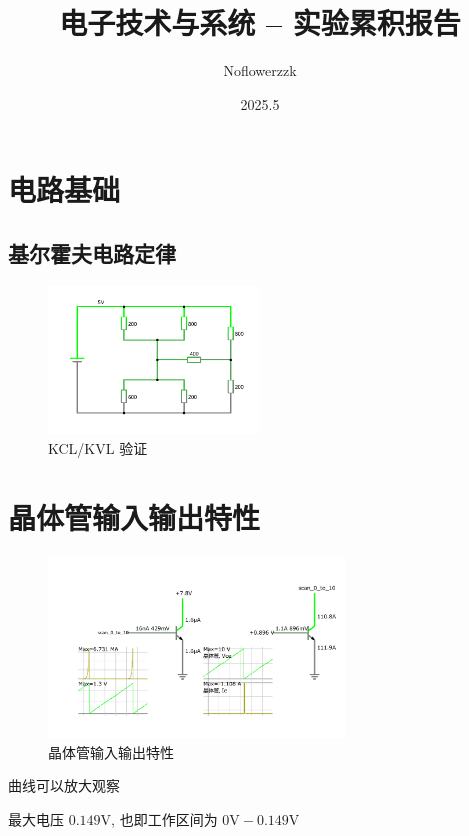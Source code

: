 \documentclass{article}
\title{电子技术与系统 -- 实验累积报告}
\author{Noflowerzzk}
\date{2025.5}
\begin{document}
\maketitle

\section{电路基础}

\subsection{基尔霍夫电路定律}

\begin{figure}[htbp]
    \centering
    \includegraphics[width=0.5\textwidth]{KICL.pdf}
    \caption{KCL/KVL 验证}
\end{figure}

\section{晶体管输入输出特性}

\begin{figure}[htbp]
    \centering
    \includegraphics[width=0.7\textwidth]{晶体管输入输出.pdf}
    \caption{晶体管输入输出特性}
\end{figure}

曲线可以放大观察
\noindent \par 最大电压 $0.149 \mathrm{V}$, 也即工作区间为 $0 \mathrm{V} - 0.149 \mathrm{V}$
\end{document}
